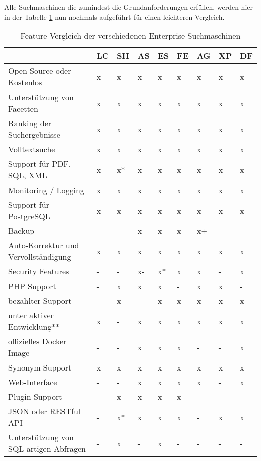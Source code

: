 Alle Suchmaschinen die zumindest die Grundanforderungen erfüllen, werden hier in der Tabelle \ref{vglTable} nun nochmals aufgeführt für einen leichteren Vergleich.

\begin{table} %
	\centering
		\begin{tabular}{l | l | l | l | l | l | l | l | l}
		& \textbf{LC} & \textbf{SH} & \textbf{AS} & \textbf{ES}  & \textbf{FE} & \textbf{AG} & \textbf{XP} & \textbf{DF} \\
        \hline
        Open-Source oder Kostenlos                  & x & x  & x & x  & x & x  & x & x \\
        Unterstützung von Facetten                  & x & x  & x & x  & x & x  & x & x \\
        Ranking der Suchergebnisse                  & x & x  & x & x  & x & x  & x & x \\
        Volltextsuche                               & x & x  & x & x  & x & x  & x & x \\
        Support für PDF, SQL, XML                   & x & x* & x & x  & x & x  & x & x \\
        Monitoring / Logging                        & x & x  & x & x  & x & x  & x & x \\
        \hline
        Support für PostgreSQL                      & x & x  & x  & x  & x & x  & x & x \\
        Backup                                      & - & -  & x  & x  & x & x+ & - & - \\
        Auto-Korrektur und Vervollständigung        & x & x  & x  & x  & x & x  & x & x \\
        Security Features                           & - & -  & x- & x* & x & x  & - & x \\
        PHP Support                                 & - & x  & x  & x  & - & x  & x & - \\
        bezahlter Support                           & - & x  & -  & x  & x & x  & x & x \\
        \hline
        unter aktiver Entwicklung**                 & x & -  & x  & x  & x & x  & x & x \\
        offizielles Docker Image                    & - & -  & x  & x  & x & -  & - & x \\
        Synonym Support                             & x & x  & x  & x  & x & x  & x & x \\
        Web-Interface                               & - & -  & x  & x  & x & x  & - & x \\
        Plugin Support                              & - & x  & x  & x  & x & -  & - & - \\
        JSON oder RESTful API                       & - & x* & x  & x  & x & -  & x-- & x \\
        Unterstützung von SQL-artigen Abfragen      & - & x  & -  & x  & - & -  & - & - \\
		\end{tabular}
    \caption{Feature-Vergleich der verschiedenen Enterprise-Suchmaschinen }
    \label{vglTable}


\end{table}
